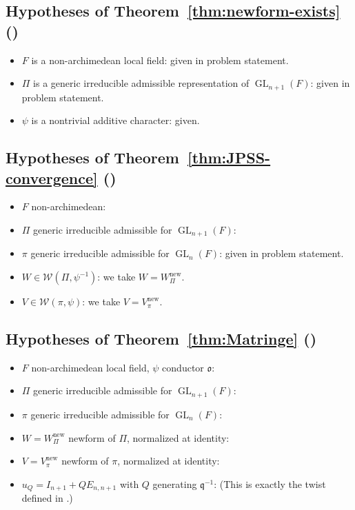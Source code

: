 \documentclass[12pt]{article}
\theoremstyle{definition}
\DeclareMathOperator{\GL}{GL}
\begin{document}
\subsection*{Hypotheses of Theorem~\ref{thm:newform-exists} (\cite{JPSS81})}
\begin{itemize}
\item $F$ is a non-archimedean local field: given in problem statement. \checkmark
\item $\Pi$ is a generic irreducible admissible representation of $\GL_{n+1}(F)$:
  given in problem statement. \checkmark
\item $\psi$ is a nontrivial additive character: given. \checkmark
\end{itemize}

\subsection*{Hypotheses of Theorem~\ref{thm:JPSS-convergence} (\cite{JPSS83})}
\begin{itemize}
\item $F$ non-archimedean: \checkmark
\item $\Pi$ generic irreducible admissible for $\GL_{n+1}(F)$: \checkmark
\item $\pi$ generic irreducible admissible for $\GL_n(F)$: given in problem statement. \checkmark
\item $W \in \mathcal{W}(\Pi,\psi^{-1})$: we take $W = W_\Pi^{\mathrm{new}}$. \checkmark
\item $V \in \mathcal{W}(\pi,\psi)$: we take $V = V_\pi^{\mathrm{new}}$. \checkmark
\end{itemize}

\subsection*{Hypotheses of Theorem~\ref{thm:Matringe} (\cite{Mat13})}
\begin{itemize}
\item $F$ non-archimedean local field, $\psi$ conductor $\mathfrak{o}$: \checkmark
\item $\Pi$ generic irreducible admissible for $\GL_{n+1}(F)$: \checkmark
\item $\pi$ generic irreducible admissible for $\GL_n(F)$: \checkmark
\item $W = W_\Pi^{\mathrm{new}}$ newform of $\Pi$, normalized at identity: \checkmark
\item $V = V_\pi^{\mathrm{new}}$ newform of $\pi$, normalized at identity: \checkmark
\item $u_Q = I_{n+1} + QE_{n,n+1}$ with $Q$ generating $\mathfrak{q}^{-1}$: \checkmark
  (This is exactly the twist defined in \cite[Definition~3.1]{Mat13}.)
\end{itemize}
\end{document}

